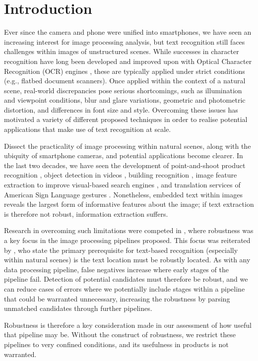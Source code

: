 \chapter{Introduction}
\label{ch:introduction}

Ever since the camera and phone were unified into smartphones, we have seen an increasing interest for image processing analysis, but text recognition still faces challenges within images of unstructured scenes. While successes in character recognition have long been developed and improved upon with Optical Character Recognition (OCR) engines \citep{Smith:1987tg}, these are typically applied under strict conditions (e.g., flatbed document scanners). Once applied within the context of a natural scene, real-world discrepancies pose serious shortcomings, such as illumination and viewpoint conditions, blur and glare variations, geometric and photometric distortion, and differences in font size and style. Overcoming these issues has motivated a variety of different proposed techniques in order to realise potential applications that make use of text recognition at scale. 

Dissect the practicality of image processing within natural scenes, along with the ubiquity of smartphone cameras, and potential applications become clearer. In the last two decades, we have seen the development of point-and-shoot product recognition \citep{Tsai:2010cn,Girod:2011gw}, object detection in videos \citep{Sivic:2003tj}, building recognition \citep{Takacs:2008cg}, image feature extraction to improve visual-based search engines \citep{Lowe:2004kp,Bay:2008ud}, and translation services of American Sign Language gestures \citep{Jin:2016jd}. Nonetheless, embedded text within images reveals the largest form of informative features about the image; if text extraction is therefore not robust, information extraction suffers.

Research in overcoming such limitations were competed in \citet{Lucas:2003iw}, where robustness was a key focus in the image processing pipelines proposed. This focus was reiterated by \citet{Chen:2011ul}, who state the primary prerequisite for text-based recognition (especially within natural scenes) is the text location must be robustly located. As with any data processing pipeline, false negatives increase where early stages of the pipeline fail. Detection of potential candidates must therefore be robust, and we can reduce cases of errors where we potentially include stages within a pipeline that could be warranted unnecessary, increasing the robustness by parsing unmatched candidates through further pipelines.

Robustness is therefore a key consideration made in our assessment of how useful that pipeline may be. Without the construct of robustness, we restrict these pipelines to very confined conditions, and its usefulness in products is not warranted.




